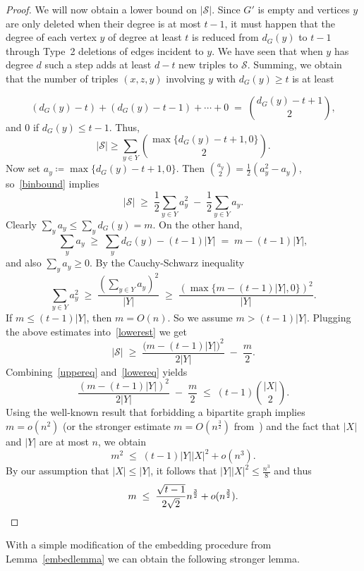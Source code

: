 \documentclass[11pt,a4paper]{article}
\theoremstyle{definition}
\begin{document}
\begin{proof}
We will now obtain a lower bound on $|\mathcal{S}|$. Since $G'$ is empty and vertices $y$ are only deleted when their degree is at most $t-1$, it must happen that the degree of each vertex $y$ of degree at least $t$ is reduced from $d_G(y)$ to $t-1$ through Type~2 deletions of edges incident to $y$. We have seen that when $y$ has degree $d$ such a step adds at least $d-t$ new triples to $\mathcal{S}$. Summing, we obtain that the number of triples $(x,z,y)$ involving $y$ with $d_G(y)\ge t$ is at least

\[
(d_G(y)-t) + (d_G(y)-t-1) + \cdots + 0 \;=\; \binom{d_G(y)-t+1}{2},
\]
and $0$ if $d_G(y)\le t-1$. Thus,
\begin{equation} \label{binbound}
|\mathcal{S}| \ge \sum_{y\in Y} \binom{\max\{d_G(y)-t+1,0\}}{2}.
\end{equation}
Now set $a_y\coloneqq \max\{d_G(y)-t+1,0\}$.
Then $\binom{a_y}{2} = \tfrac12(a_y^2-a_y)$, so~\eqref{binbound} implies
\begin{equation}\label{lowerest}
|\mathcal{S}|
\;\ge\;
\frac{1}{2}\sum_{y\in Y} a_y^2 \;-\; \frac{1}{2}\sum_{y\in Y} a_y.
\end{equation}
Clearly $\sum_y a_y \le \sum_y d_G(y) = m$. On the other hand, 
\[
\sum_y a_y \;\ge\; \sum_y d_G(y) - (t-1)|Y| \;=\; m - (t-1)|Y|,
\]
and also $\sum_y a_y \ge 0$. By the Cauchy-Schwarz inequality 
\[
\sum_{y\in Y} a_y^2 \;\ge\; \frac{(\sum_{y\in Y} a_y)^2}{|Y|}
\;\ge\; \frac{(\max\{m-(t-1)|Y|,0\})^2}{|Y|}.
\]
If $m \le (t-1)|Y|$, then $m=O(n)$. So we assume $m>(t-1)|Y|$.  Plugging the above estimates into~\eqref{lowerest} we get
\begin{equation}
\label{lowereq}
|\mathcal{S}|
\;\ge\;
\frac{\bigl(m-(t-1)|Y|\bigr)^2}{2|Y|} \;-\; \frac{m}{2}.
\end{equation}
Combining~\eqref{uppereq} and~\eqref{lowereq} yields
\[
\frac{(m-(t-1)|Y|)^2}{2|Y|} \;-\; \frac{m}{2}
\;\le\;
(t-1)\binom{|X|}{2}.
\]
Using the well-known result that forbidding a bipartite graph implies $m=o(n^2)$ (or the stronger estimate $m=O(n^{\frac{3}{2}})$ from~\cite{bradavc2023turan}) and the fact that $|X|$ and $|Y|$ are at most $n$, we obtain
\[
m^2  \;\le\; (t-1)|Y||X|^2 +o(n^3).
\]
By our assumption that $|X|\le |Y|$, it follows that $|Y||X|^2 \le \frac{n^3}{8}$ and thus
\[
m \;\le\; \frac{\sqrt{t-1}}{2\sqrt{2}}n^{\frac{3}{2}} + o(n^{\frac{3}{2}}).\qedhere
\]
\end{proof}

With a simple modification of the embedding procedure from Lemma~\ref{embedlemma} we can obtain the following stronger lemma.
\end{document}
